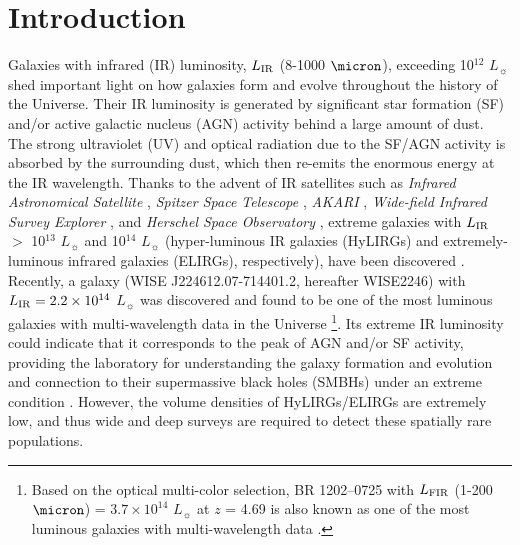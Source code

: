 \documentclass[twocolumn]{aastex6}
\begin{document}


\section{Introduction} 
\label{Intro}

Galaxies with infrared (IR) luminosity, $L_{\rm IR}$ (8-1000 $\micron$), exceeding 10$^{12}$ $L_{\sun}$ shed important light on how galaxies form and evolve throughout the history of the Universe. 
Their IR luminosity is generated by significant star formation (SF) and/or active galactic nucleus (AGN) activity behind a large amount of dust.
The strong ultraviolet (UV) and optical radiation due to the SF/AGN activity is absorbed by the surrounding dust, which then re-emits the enormous energy at the IR wavelength.
Thanks to the advent of IR satellites such as {\it Infrared Astronomical Satellite} \citep[{\it IRAS}: ][]{Neugebauer}, {\it Spitzer Space Telescope} \citep{Werner}, {\it AKARI} \citep{Murakami}, {\it Wide-field Infrared Survey Explorer} \citep[{\it WISE}: ][]{Wright}, and {\it Herschel Space Observatory} \citep{Pilbratt}, extreme galaxies with $L_{\rm IR}$ $>$ 10$^{13}$ $L_{\sun}$ and 10$^{14}$ $L_{\sun}$ (hyper-luminous IR galaxies (HyLIRGs) and extremely-luminous infrared galaxies (ELIRGs), respectively), have been discovered \citep[e.g.,][]{Rowan-Robinson,Tsai}.
Recently, a galaxy (WISE J224612.07-714401.2, hereafter WISE2246) with $L_{\rm IR} = 2.2 \times 10^{14}$ $L_{\sun}$ was discovered \citep{Tsai} and found to be one of the most luminous galaxies with multi-wavelength data in the Universe \footnote{Based on the optical multi-color selection, BR 1202--0725 with $L_{\rm FIR}$ (1-200 $\micron$) = $3.7 \times 10^{14}$ $L_{\sun}$ at $z$ = 4.69 is also known as one of the most luminous galaxies  with multi-wavelength data \citep{Leipski}.}.
Its extreme IR luminosity could indicate that it corresponds to the peak of AGN and/or SF activity, providing the laboratory for understanding the galaxy formation and evolution and connection to their supermassive black holes (SMBHs) under an extreme condition \citep{Hopkins,Ricci}.
However, the volume densities of HyLIRGs/ELIRGs are extremely low, and thus wide and deep surveys are required to detect these spatially rare populations.
\end{document}
